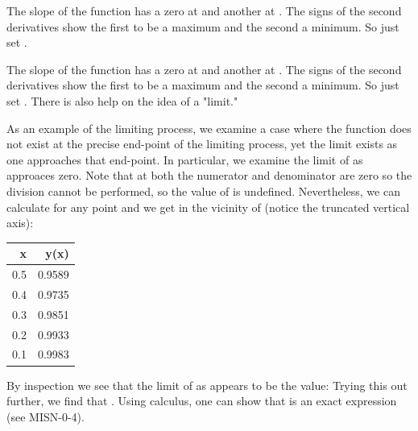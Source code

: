 {
{The slope of the function has a zero at  and another at .
 The signs of the second derivatives show the first to be a maximum and the second a minimum.
 So just set .
}

{The slope of the function has a zero at  and another at .
 The signs of the second derivatives show the first to be a maximum and the second a minimum.
 So just set . There is also help on the idea of a "limit." 
}

{As an example of the limiting process, we examine a case where the function does not exist
at the precise end-point of the limiting process, yet the limit exists as one approaches that end-point.
In particular, we examine the limit of  as  approaces zero.
Note that at  both the numerator and denominator are zero so the division cannot be performed, so
the value of  is undefined.
Nevertheless, we can calculate  for any point  and we get in the vicinity of
 (notice the truncated vertical axis):
%
%
\begin{center}\begin{tabular}{|r|r|}\hline
x & y(x) \\ \hline
0.5 & 0.9589 \\
0.4 & 0.9735 \\
0.3 & 0.9851 \\
0.2 & 0.9933 \\
0.1 & 0.9983 \\ \hline
\end{tabular}\end{center}
By inspection we see that the limit of  as  appears to be the value:
%
%
Trying this out further, we find that .
Using calculus, one can show that  is an exact expression (see
 MISN-0-4).
}

}%
